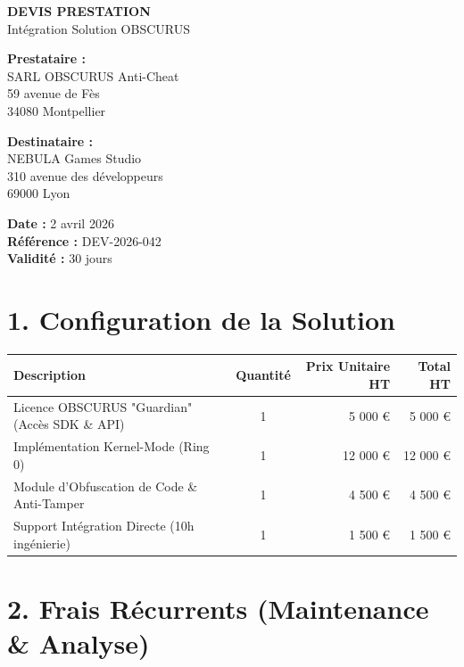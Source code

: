 \documentclass[a4paper,11pt]{article}
\begin{document}
\begin{center}
    \textbf{\huge DEVIS PRESTATION} \\
    \vspace{2mm}
    \large Intégration Solution OBSCURUS
\end{center}

\vspace{1cm}

\begin{minipage}[t]{0.5\textwidth}
    \textbf{Prestataire :} \\
    SARL OBSCURUS Anti-Cheat \\
    59 avenue de Fès \\
    34080 Montpellier
\end{minipage}
\begin{minipage}[t]{0.5\textwidth}
    \textbf{Destinataire :} \\
    NEBULA Games Studio \\
    310 avenue des développeurs \\
    69000 Lyon
\end{minipage}

\vspace{1cm}

\noindent \textbf{Date :} 2 avril 2026 \\
\textbf{Référence :} DEV-2026-042 \\
\textbf{Validité :} 30 jours

\section{1. Configuration de la Solution}

\begin{tabularx}{\textwidth}{|X|c|r|r|}
\hline
\textbf{Description} & \textbf{Quantité} & \textbf{Prix Unitaire HT} & \textbf{Total HT} \\
\hline
Licence OBSCURUS "Guardian" (Accès SDK \& API) & 1 & 5 000 \euro & 5 000 \euro \\
\hline
Implémentation Kernel-Mode (Ring 0) & 1 & 12 000 \euro & 12 000 \euro \\
\hline
Module d'Obfuscation de Code \& Anti-Tamper & 1 & 4 500 \euro & 4 500 \euro \\
\hline
Support Intégration Directe (10h ingénierie) & 1 & 1 500 \euro & 1 500 \euro \\
\hline
\end{tabularx}

\section{2. Frais Récurrents (Maintenance \& Analyse)}
\end{document}
